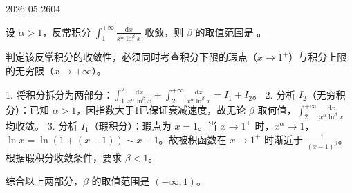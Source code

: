 \begin{mistake}{2026-05-26}{04}

\begin{problemcontent}
设 \(\alpha > 1\)，反常积分 \(\int_1^{+\infty} \frac{\mathrm{d}x}{x^\alpha \ln^\beta x}\) 收敛，则 \(\beta\) 的取值范围是 \underline{\hspace{2cm}}。
\end{problemcontent}

\begin{solutioncontent}
判定该反常积分的收敛性，必须同时考查积分下限的瑕点（\(x \to 1^+\)）与积分上限的无穷限（\(x \to +\infty\)）。

1. 将积分拆分为两部分：\(\int_1^2 \frac{\mathrm{d}x}{x^\alpha \ln^\beta x} + \int_2^{+\infty} \frac{\mathrm{d}x}{x^\alpha \ln^\beta x} = I_1 + I_2\)。
2. 分析 \(I_2\)（无穷积分）：已知 \(\alpha > 1\)，因指数大于1已保证衰减速度，故无论 \(\beta\) 取何值，\(\int_2^{+\infty} \frac{\mathrm{d}x}{x^\alpha \ln^\beta x}\) 均收敛。
3. 分析 \(I_1\)（瑕积分）：瑕点为 \(x = 1\)。当 \(x \to 1^+\) 时，\(x^\alpha \to 1\)，\(\ln x = \ln(1+(x-1)) \sim x-1\)。故被积函数在 \(x \to 1^+\) 时渐近于 \(\frac{1}{(x-1)^\beta}\)。根据瑕积分收敛条件，要求 \(\beta < 1\)。

综合以上两部分，\(\beta\) 的取值范围是 \((-\infty, 1)\)。
\end{solutioncontent}


\end{mistake}
